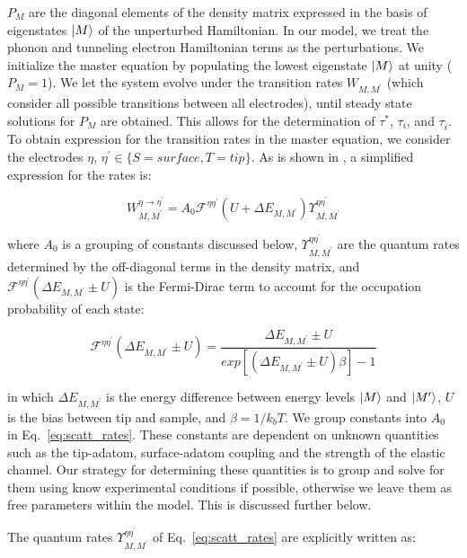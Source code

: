 \documentclass[reprint,amsmath,amssymb,aps,nofootinbib,onecolumn]{revtex4-2}
\begin{document}
$P_M$ are the diagonal elements of the density matrix expressed in the basis of eigenstates $\ket{M}$ of the unperturbed Hamiltonian. In our model, we treat the phonon and tunneling electron Hamiltonian terms as the perturbations. We initialize the master equation by populating the lowest eigenstate $\ket{M}$ at unity ($P_M = 1$). We let the system evolve under the transition rates $W_{M,M^{\prime}}$ (which consider all possible transitions between all electrodes), until steady state solutions for $P_M$ are obtained. This allows for the determination of $\tau^{*}$, $\tau_i$, and $\tau_{\overline{i}}$.   
To obtain expression for the transition rates in the master equation, we consider the electrodes $\eta$, $\eta^{\prime} \in\lbrace S=surface, T=tip\rbrace$. As is shown in \cite{delgado2010}, a simplified expression for the rates is:

\begin{equation}
W_{M,M^{\prime}}^{\eta \rightarrow \eta^{\prime}}=A_0 \mathcal{F}^{\eta\eta^{\prime}}(U+\Delta E_{M,M^{\prime}})\Upsilon^{\eta\eta^{\prime}}_{M,M^{\prime}}
\label{eq:scatt_rates}
\end{equation}

where $A_0$ is a grouping of constants discussed below, $\Upsilon^{\eta\eta^{\prime}}_{M,M^{\prime}}$ are the quantum rates determined by the off-diagonal terms in the density matrix, and  $\mathcal{F}^{\eta\eta^{\prime}}(\Delta E_{M,M^{\prime}}\pm U )$ is the Fermi-Dirac term to account for the occupation probability of each state:

\begin{equation}
\mathcal{F}^{\eta\eta^{\prime}}(\Delta E_{M,M^{\prime}}\pm U )=\dfrac{\Delta E_{M,M^{\prime}}\pm U}{exp\left[\left( \Delta E_{M,M^{\prime}}\pm U  \right)\beta\right]-1}
\label{eq:fermi_conv}
\end{equation}

in which $\Delta E_{M,M^{\prime}}$ is the energy difference between energy levels $\ket{M}$ and $\ket{M^{\prime}}$, $U$ is the bias between tip and sample, and $\beta=1/k_b T$. We group constants into $A_0$ in Eq.~\ref{eq:scatt_rates}. These constants are dependent on unknown quantities such as the tip-adatom, surface-adatom coupling and the strength of the elastic channel. Our strategy for determining these quantities is to group and solve for them using know experimental conditions if possible, otherwise we leave them as free parameters within the model. This is discussed further below. 

The quantum rates $\Upsilon^{\eta\eta^{\prime}}_{M,M^{\prime}}$ of Eq.~\ref{eq:scatt_rates} are explicitly written as:
\end{document}
